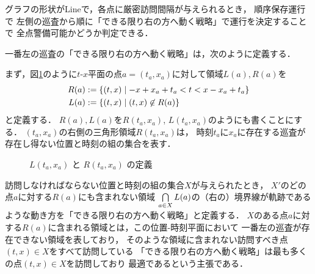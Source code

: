 \begin{theo}
  \label{theo:LineExactFinite}
  グラフの形状がLineで，各点に厳密訪問間隔が与えられるとき，
  順序保存運行で
  左側の巡査から順に「できる限り右の方へ動く戦略」で運行を決定することで
  全点警備可能かどうか判定できる．
\end{theo}


一番左の巡査の「できる限り右の方へ動く戦略」は，次のように定義する．

まず，図\ref{tikz:defLR}のように$t$-$x$平面の点$a = (t_a,x_a)$に対して領域$L(a), R(a)$を
\begin{align*}
  R(a) &:= \left\{{(t,x)}\;\middle|\;{ -x + x_a + t_a < t < x - x_a + t_a }\right\} \\
  L(a) &:= \left\{{(t,x)}\;\middle|\;{ (t,x) \not\in R(a) }\right\}
\end{align*}
と定義する．
$R(a),L(a)$を$R(t_a, x_a)$, $L(t_a, x_a)$のようにも書くことにする．
$(t_a, x_a)$の右側の三角形領域$R(t_a, x_a)$は，
時刻$t_a$に$x_a$に存在する巡査が存在し得ない位置と時刻の組の集合を表す．

\begin{figure}[h]
  \centering
  \caption{$L(t_a,x_a)$ と $R(t_a,x_a)$ の定義 \label{tikz:defLR}}
\end{figure}



訪問しなければならない位置と時刻の組の集合$X$が与えられたとき，
$X'$のどの点$a$に対する$R(a)$にも含まれない領域
$\bigcap\limits_{a \in X} L(a)$の（右の）境界線が軌跡であるような動き方を「できる限り右の方へ動く戦略」と定義する．
%
$X$のある点$a$に対する$R(a)$に含まれる領域とは，この位置-時刻平面において
一番左の巡査が存在できない領域を表しており，
そのような領域に含まれない訪問すべき点$(t,x) \in X$をすべて訪問している
「できる限り右の方へ動く戦略」は最も多くの点$(t,x) \in X$を訪問しており
最適であるという主張である．



